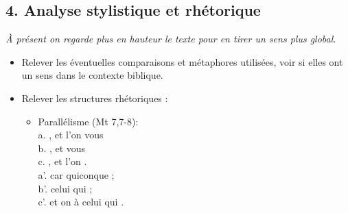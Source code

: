 \subsection*{4. Analyse stylistique et rhétorique}
\textit{À présent on regarde plus en hauteur le texte pour en tirer un sens plus global.}
\begin{itemize}[label=]
\item Relever les éventuelles comparaisons et métaphores utilisées, voir si elles ont un sens dans le contexte biblique.
\item Relever les structures rhétoriques :
\begin{itemize}[label=]
\item Parallélisme (Mt 7,7-8):\\
\decalage a. , et l’on vous \\
\decalage \decalage b. , et vous \\
\decalage \decalage \decalage c. , et l’on .\\
\decalage a’. car quiconque  ;\\
\decalage \decalage b’. celui qui  ;\\
\decalage \decalage \decalage c’. et on  à celui qui .\par


\end{itemize}
\end{itemize}
